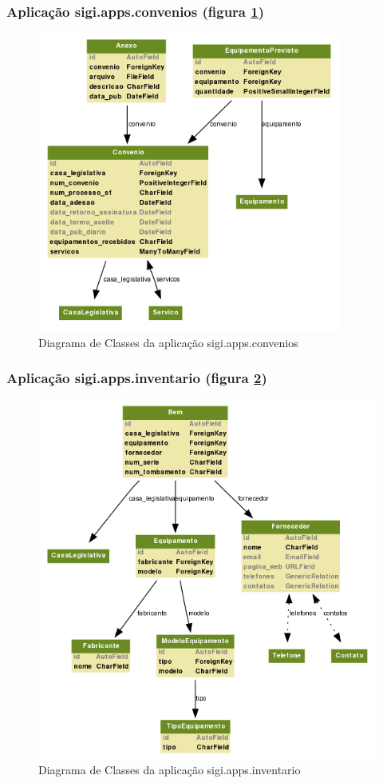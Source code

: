 \subsubsection{Aplicação sigi.apps.convenios (figura \ref{fig:convenios})}
\begin{figure}[h!]
  \centering
  \includegraphics[width=100mm]{../imagens/convenios.png}
  \caption{Diagrama de Classes da aplicação sigi.apps.convenios}
  \label{fig:convenios}
\end{figure}

\subsubsection{Aplicação sigi.apps.inventario (figura \ref{fig:inventario})}
\begin{figure}[h!]
  \centering
  \includegraphics[width=120mm]{../imagens/inventario.png}
  \caption{Diagrama de Classes da aplicação sigi.apps.inventario}
  \label{fig:inventario}
\end{figure}

